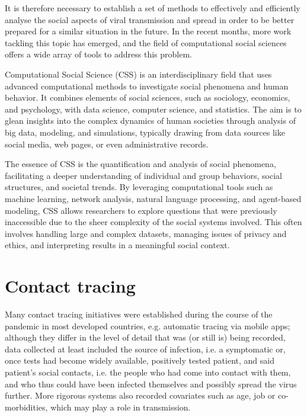 It is therefore necessary to establish a set of methods to effectively and efficiently analyse the social aspects of viral transmission and spread in order to be better prepared for a similar situation in the future. In the recent months, more work tackling this topic has emerged, and the field of computational social sciences offers a wide array of tools to address this problem.

Computational Social Science (CSS) is an interdisciplinary field that uses advanced computational methods to investigate social phenomena and human behavior. It combines elements of social sciences, such as sociology, economics, and psychology, with data science, computer science, and statistics. The aim is to glean insights into the complex dynamics of human societies through analysis of big data, modeling, and simulations, typically drawing from data sources like social media, web pages, or even administrative records.

The essence of CSS is the quantification and analysis of social phenomena, facilitating a deeper understanding of individual and group behaviors, social structures, and societal trends. By leveraging computational tools such as machine learning, network analysis, natural language processing, and agent-based modeling, CSS allows researchers to explore questions that were previously inaccessible due to the sheer complexity of the social systems involved. This often involves handling large and complex datasets, managing issues of privacy and ethics, and interpreting results in a meaningful social context.

\section{Contact tracing}
\label{sec:contact_tracing}

Many contact tracing initiatives were established during the course of the pandemic in most developed countries, e.g. automatic tracing via mobile apps; although they differ in the level of detail that was (or still is) being recorded, data collected at least included the source of infection, i.e. a symptomatic or, once tests had become widely available, positively tested patient, and said patient's social contacts, i.e. the people who had come into contact with them, and who thus could have been infected themselves and possibly spread the virus further. More rigorous systems also recorded covariates such as age, job or co-morbidities, which may play a role in transmission. 

